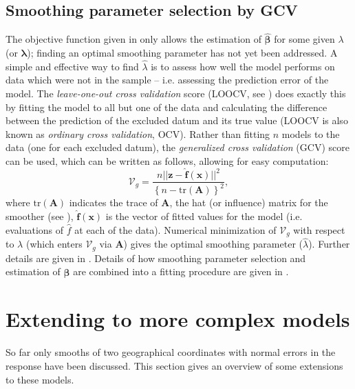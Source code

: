\subsection{Smoothing parameter selection by GCV}
\label{GAMfitting}

The objective function given in  only allows the estimation of $\bm{\hat{\beta}}$ for some given $\lambda$ (or $\bm{\lambda}$); finding an optimal smoothing parameter has not yet been addressed.  A simple and effective way to find $\hat{\lambda}$ is to assess how well the model performs on data which were not in the sample -- i.e. assessing the prediction error of the model. The \textit{leave-one-out cross validation} score (LOOCV, see ) does exactly this by fitting the model to all but one of the data and calculating the difference between the prediction of the excluded datum and its true value (LOOCV is also known as \textit{ordinary cross validation}, OCV). Rather than fitting $n$ models to the data (one for each excluded datum), the \textit{generalized cross validation} (GCV) score can be used, which can be written as follows, allowing for easy computation:
\begin{equation}
\mathcal{V}_g = \frac{n \lvert\lvert \mathbf{z} - \mathbf{\hat{f}}(\mathbf{x})\rvert \rvert^2}{\left \{n-\text{tr}(\mathbf{A}) \right \}^2},
\label{intro-GCV}
\end{equation}
where $\text{tr}(\mathbf{A})$ indicates the trace of $\mathbf{A}$, the hat (or influence) matrix for the smoother (see ), $\mathbf{\hat{f}}(\mathbf{x})$ is the vector of fitted values for the model (i.e. evaluations of $\hat{f}$ at each of the data). Numerical minimization of $\mathcal{V}_g$ with respect to $\lambda$ (which enters $\mathcal{V}_g$ via $\mathbf{A}$) gives the optimal smoothing parameter ($\hat{\lambda}$). Further details are given in . Details of how smoothing parameter selection and estimation of $\bm{\hat{\beta}}$ are combined into a fitting procedure are given in .



\section{Extending to more complex models}
\label{intro-extending}

So far only smooths of two geographical coordinates with normal errors in the response have been discussed. This section gives an overview of some extensions to these models.

